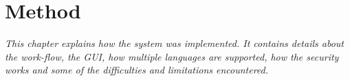 \chapter{Method}

\textit{This chapter explains how the system was implemented. It contains details about the work-flow, the GUI, how multiple languages are supported, how the security works and some of the difficulties and limitations encountered.}









